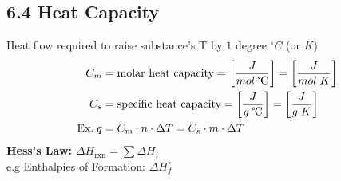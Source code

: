 \subsection{6.4 Heat Capacity}
    \vspace*{0.2em}
    Heat flow required to raise substance's T by $1$ degree $^\circ C$ (or $K$)
    \begin{align*}
        C_m & = \text{molar heat capacity} = \left[\frac{J}{mol \; \tccentigrade}\right] = \left[\frac{J}{mol \; K}\right]\\
        C_s & = \text{specific heat capacity} = \left[\frac{J}{g \; \tccentigrade}\right] = \left[\frac{J}{g \; K}\right]\\
        \text{Ex.} \; q & = C_\text{m} \cdot n \cdot \Delta T = C_s \cdot m \cdot \Delta T
    \end{align*}
    \textbf{Hess's Law:} $\Delta H_\text{rxn} = \sum \Delta H_i$\\
    e.g Enthalpies of Formation: $\Delta H^\circ_f$